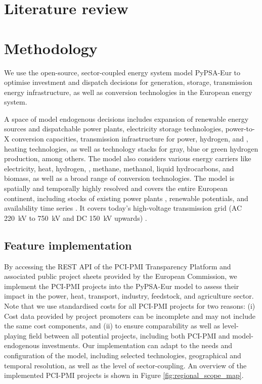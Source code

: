 \documentclass[preprint,12pt]{elsarticle}
\begin{document}
\newpage
\section{Literature review}
\label{sec:literature_review}

\newpage
\section{Methodology}
\label{sec:methodology}

We use the open-source, sector-coupled energy system model PyPSA-Eur \cite{neumannPotentialRoleHydrogen2023,frysztackiComparisonClusteringMethods2022,glaumOffshorePowerHydrogen2024,horschPyPSAEurOpenOptimisation2018} to optimise investment and dispatch decisions for generation, storage, transmission energy infrastructure, as well as conversion technologies in the European energy system.



A space of model endogenous decisions includes expansion of renewable energy sources and dispatchable power plants, electricity storage technologies, power-to-X conversion capacities, transmission infrastructure for power, hydrogen, and , heating technologies, as well as technology stacks for gray, blue or green hydrogen production, among others. 
The model also considers various energy carriers like electricity, heat, hydrogen, , methane, methanol, liquid hydrocarbons, and biomass, as well as a broad range of conversion technologies.
The model is spatially and temporally highly resolved and covers the entire European continent, including stocks of existing power plants \cite{gotzensPerformingEnergyModelling2019}, renewable potentials, and availability time series \cite{hofmannAtliteLightweightPython2021}. It covers today's high-voltage transmission grid (AC \SI{220}{kV} to \SI{750}{kV} and DC \SI{150}{kV} upwards) \cite{xiongModellingHighVoltageGrid2024}.

\subsection{Feature implementation}
\label{sec:feature_implementation}

By accessing the REST API of the PCI-PMI Transparency Platform \cite{europeancommissionPCIPMITransparencyPlatform2024} and associated public project sheets provided by the European Commission, we implement the PCI-PMI projects into the PyPSA-Eur model to assess their impact in the power, heat, transport, industry, feedstock, and agriculture sector. Note that we use standardised costs for all PCI-PMI projects \cite{zeyenPyPSATechnologydataV0922024} for two reasons: (i) Cost data provided by project promoters can be incomplete and may not include the same cost components, and (ii) to ensure comparability as well as level-playing field between all potential projects, including both PCI-PMI and model-endogenous investments.
Our implementation can adapt to the needs and configuration of the model, including selected technologies, geographical and temporal resolution, as well as the level of sector-coupling. An overview of the implemented PCI-PMI projects is shown in Figure \ref{fig:regional_scope_map}.
\end{document}

